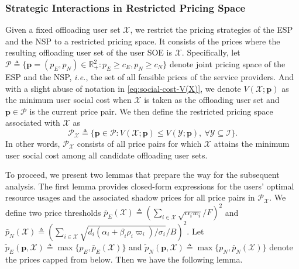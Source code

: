 \documentclass[lettersize,journal]{IEEEtran}
\newcommand{\ie}{\emph{i.e.}}
\begin{document}
\subsubsection{Strategic Interactions in Restricted Pricing Space}
Given a fixed offloading user set $\mathcal{X}$, we restrict the pricing strategies of the ESP and the NSP to a restricted pricing space. It consists of the prices where the resulting offloading user set of the user SOE is $\mathcal{X}$. Specifically, let $\mathcal{P}\triangleq\{\boldsymbol{p}=(p_E,p_N)\in\mathbb{R}_+^2:p_E\ge c_E,p_N\ge c_N\}$ denote joint pricing space of the ESP and the NSP, \ie, the set of all feasible prices of the service providers. And with a slight abuse of notation in \eqref{eq:social-cost-V(X)}, we denote $V(\mathcal{X};\boldsymbol{p})$ as the minimum user social cost when $\mathcal{X}$ is taken as the offloading user set and $\boldsymbol{p}\in\mathcal{P}$ is the current price pair.
We then define the restricted pricing space associated with $\mathcal{X}$ as
\begin{equation}\label{eq:P_X}
\mathcal{P}_{\mathcal{X}}
\triangleq
\bigg\{
\boldsymbol{p}\in\mathcal{P}:
V(\mathcal{X};\boldsymbol{p})\le V(\mathcal{Y};\boldsymbol{p}),
\ \forall \mathcal{Y}\subseteq\mathcal{I}
\bigg\}.
\end{equation}
In other words, $\mathcal{P}_{\mathcal{X}}$ consists of all price pairs for which $\mathcal{X}$ attains the minimum user social cost among all candidate offloading user sets.

To proceed, we present two lemmas that prepare the way for the subsequent analysis. The first lemma provides closed-form expressions for the users' optimal resource usages and the associated shadow prices for all price pairs in $\mathcal{P}_{\mathcal{X}}$.
We define two price thresholds $\bar p_E(\mathcal{X})\triangleq (\sum_{i\in\mathcal{X}}\sqrt{\alpha_i w_i}/F)^2$ and $\bar p_N(\mathcal{X})\triangleq (\sum_{i\in\mathcal{X}}\sqrt{d_i(\alpha_i+\beta_i\rho_i\varpi_i)/\sigma_i}/B)^2$.
Let $\tilde p_E(\boldsymbol{p},\mathcal{X})
\triangleq \max\{p_E,\bar p_E(\mathcal{X})\}$ and $\tilde p_N(\boldsymbol{p},\mathcal{X})
\triangleq \max\{p_N, \bar p_N(\mathcal{X})\}$ denote the prices capped from below.
Then we have the following lemma.
\end{document}
